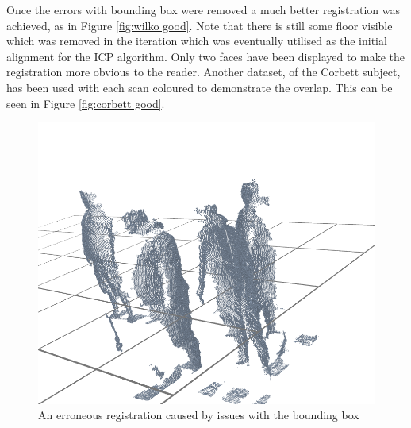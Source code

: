 Once the errors with bounding box were removed a much better registration was achieved, as in Figure \ref{fig:wilko good}. Note that there is still some floor visible which was removed in the iteration which was eventually utilised as the initial alignment for the ICP algorithm. Only two faces have been displayed to make the registration more obvious to the reader. Another dataset, of the Corbett subject, has been used with each scan coloured to demonstrate the overlap. This can be seen in Figure \ref{fig:corbett good}. \\

\begin{figure}[h!]
    \begin{center}
        \includegraphics[scale=0.3]{zscreenshots/wilko-floor.png}
        \caption{An erroneous registration caused by issues with the bounding box}
        \label{fig:wilko floor problem}
    \end{center}
\end{figure} \\

